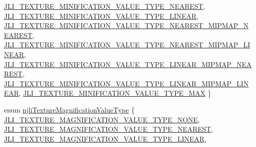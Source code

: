 \begin{DoxyCompactItemize}
\mbox{\hyperlink{namespacenjli_a980b62f11da3b7143a525012cb512baca0e5f9c0de2d17ebab337536717a866ee}{J\+L\+I\+\_\+\+T\+E\+X\+T\+U\+R\+E\+\_\+\+M\+I\+N\+I\+F\+I\+C\+A\+T\+I\+O\+N\+\_\+\+V\+A\+L\+U\+E\+\_\+\+T\+Y\+P\+E\+\_\+\+N\+E\+A\+R\+E\+ST}}, 
\mbox{\hyperlink{namespacenjli_a980b62f11da3b7143a525012cb512bacabcef37117765fdc950d66b500660e7d9}{J\+L\+I\+\_\+\+T\+E\+X\+T\+U\+R\+E\+\_\+\+M\+I\+N\+I\+F\+I\+C\+A\+T\+I\+O\+N\+\_\+\+V\+A\+L\+U\+E\+\_\+\+T\+Y\+P\+E\+\_\+\+L\+I\+N\+E\+AR}}, 
\mbox{\hyperlink{namespacenjli_a980b62f11da3b7143a525012cb512baca735e4154e8e5c3b7b6ed4fce8415dfd2}{J\+L\+I\+\_\+\+T\+E\+X\+T\+U\+R\+E\+\_\+\+M\+I\+N\+I\+F\+I\+C\+A\+T\+I\+O\+N\+\_\+\+V\+A\+L\+U\+E\+\_\+\+T\+Y\+P\+E\+\_\+\+N\+E\+A\+R\+E\+S\+T\+\_\+\+M\+I\+P\+M\+A\+P\+\_\+\+N\+E\+A\+R\+E\+ST}}, 
\newline
\mbox{\hyperlink{namespacenjli_a980b62f11da3b7143a525012cb512baca54fe6ca3122ab5e3bbb4a9304c50d347}{J\+L\+I\+\_\+\+T\+E\+X\+T\+U\+R\+E\+\_\+\+M\+I\+N\+I\+F\+I\+C\+A\+T\+I\+O\+N\+\_\+\+V\+A\+L\+U\+E\+\_\+\+T\+Y\+P\+E\+\_\+\+N\+E\+A\+R\+E\+S\+T\+\_\+\+M\+I\+P\+M\+A\+P\+\_\+\+L\+I\+N\+E\+AR}}, 
\mbox{\hyperlink{namespacenjli_a980b62f11da3b7143a525012cb512baca0a51cd436376fc2d072017822a1588ac}{J\+L\+I\+\_\+\+T\+E\+X\+T\+U\+R\+E\+\_\+\+M\+I\+N\+I\+F\+I\+C\+A\+T\+I\+O\+N\+\_\+\+V\+A\+L\+U\+E\+\_\+\+T\+Y\+P\+E\+\_\+\+L\+I\+N\+E\+A\+R\+\_\+\+M\+I\+P\+M\+A\+P\+\_\+\+N\+E\+A\+R\+E\+ST}}, 
\mbox{\hyperlink{namespacenjli_a980b62f11da3b7143a525012cb512baca39d8ea38f0a6031c6aee61dbfef742b3}{J\+L\+I\+\_\+\+T\+E\+X\+T\+U\+R\+E\+\_\+\+M\+I\+N\+I\+F\+I\+C\+A\+T\+I\+O\+N\+\_\+\+V\+A\+L\+U\+E\+\_\+\+T\+Y\+P\+E\+\_\+\+L\+I\+N\+E\+A\+R\+\_\+\+M\+I\+P\+M\+A\+P\+\_\+\+L\+I\+N\+E\+AR}}, 
\mbox{\hyperlink{namespacenjli_a980b62f11da3b7143a525012cb512baca839e6bf7ffee928b16c3aa23e5634441}{J\+L\+I\+\_\+\+T\+E\+X\+T\+U\+R\+E\+\_\+\+M\+I\+N\+I\+F\+I\+C\+A\+T\+I\+O\+N\+\_\+\+V\+A\+L\+U\+E\+\_\+\+T\+Y\+P\+E\+\_\+\+M\+AX}}
 \}
\item 
enum \mbox{\hyperlink{namespacenjli_a9fe7a080d946c5be3afc71d834dc7902}{njli\+Texture\+Magnification\+Value\+Type}} \{ \mbox{\hyperlink{namespacenjli_a9fe7a080d946c5be3afc71d834dc7902a9bbe31a40306010625d26211f98dbfb1}{J\+L\+I\+\_\+\+T\+E\+X\+T\+U\+R\+E\+\_\+\+M\+A\+G\+N\+I\+F\+I\+C\+A\+T\+I\+O\+N\+\_\+\+V\+A\+L\+U\+E\+\_\+\+T\+Y\+P\+E\+\_\+\+N\+O\+NE}}, 
\mbox{\hyperlink{namespacenjli_a9fe7a080d946c5be3afc71d834dc7902a644ebd1fbf4af394c0cbdb13530f2c01}{J\+L\+I\+\_\+\+T\+E\+X\+T\+U\+R\+E\+\_\+\+M\+A\+G\+N\+I\+F\+I\+C\+A\+T\+I\+O\+N\+\_\+\+V\+A\+L\+U\+E\+\_\+\+T\+Y\+P\+E\+\_\+\+N\+E\+A\+R\+E\+ST}}, 
\mbox{\hyperlink{namespacenjli_a9fe7a080d946c5be3afc71d834dc7902a04d90ce3c66bf6b57b9cddeba4e70653}{J\+L\+I\+\_\+\+T\+E\+X\+T\+U\+R\+E\+\_\+\+M\+A\+G\+N\+I\+F\+I\+C\+A\+T\+I\+O\+N\+\_\+\+V\+A\+L\+U\+E\+\_\+\+T\+Y\+P\+E\+\_\+\+L\+I\+N\+E\+AR}}, 

\end{DoxyCompactItemize}
